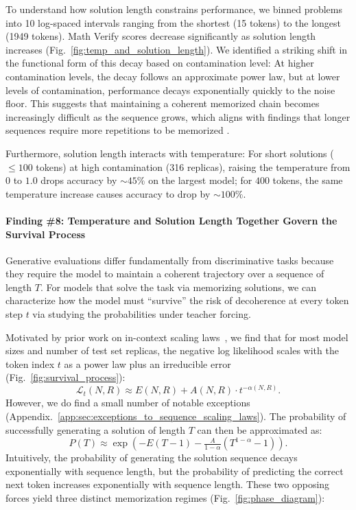 To understand how solution length constrains performance, we binned problems into 10 log-spaced intervals ranging from the shortest (15 tokens) to the longest (1949 tokens).
Math Verify scores decrease significantly as solution length increases (Fig.~\ref{fig:temp_and_solution_length}).
We identified a striking shift in the functional form of this decay based on contamination level:
At higher contamination levels, the decay follows an approximate power law, but at lower levels of contamination, performance decays exponentially quickly to the noise floor.
This suggests that maintaining a coherent memorized chain becomes increasingly difficult as the sequence grows, which aligns with findings that longer sequences require more repetitions to be memorized \citep{jiang2025a,lu2024scaling}.

Furthermore, solution length interacts with temperature:
For short solutions ($\leq 100$ tokens) at high contamination (316 replicas), raising the temperature from $0$ to $1.0$ drops accuracy by $\mathord{\sim}45\%$ on the largest model; for $400$ tokens, the same temperature increase causes accuracy to drop by $\mathord{\sim}100\%$.


\paragraph{Finding \#8: Temperature and Solution Length Together Govern the Survival Process}

Generative evaluations differ fundamentally from discriminative tasks because they require the model to maintain a coherent trajectory over a sequence of length $T$.
For models that solve the task via memorizing solutions, we can characterize how the model must ``survive'' the risk of decoherence at every token step $t$ via studying the probabilities under teacher forcing.

Motivated by prior work on in-context scaling laws~\citep{anthropic2023claude2,geminiteam2024gemini15unlockingmultimodal,xiong2024effective,anil2024many}, we find that for most model sizes and number of test set replicas, the negative log likelihood scales with the token index $t$ as a power law plus an irreducible error (Fig.~\ref{fig:survival_process}):
\begin{equation}\label{eqn:in_context_scaling_law}
    \mathcal{L}_t(N, R) \approx E(N, R) + A(N, R) \cdot t^{-\alpha(N, R)}.
\end{equation}
However, we do find a small number of notable exceptions (Appendix.~\ref{app:sec:exceptions_to_sequence_scaling_laws}).
The probability of successfully generating a solution of length $T$ can then be approximated as:
\begin{equation}
    \label{eq:survival_prob}
    P(T) \approx \exp\left( -E(T-1) - \tfrac{A}{1-\alpha}(T^{1-\alpha} - 1) \right).
\end{equation}
Intuitively, the probability of generating the solution sequence decays exponentially with sequence length, but the probability of predicting the correct next token increases exponentially with sequence length.
These two opposing forces yield three distinct memorization regimes (Fig.~\ref{fig:phase_diagram}):

